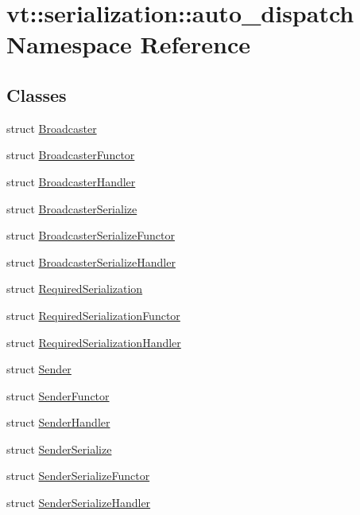 \hypertarget{namespacevt_1_1serialization_1_1auto__dispatch}{}\section{vt\+:\+:serialization\+:\+:auto\+\_\+dispatch Namespace Reference}
\label{namespacevt_1_1serialization_1_1auto__dispatch}
\subsection*{Classes}
\begin{DoxyCompactItemize}
\item 
struct \hyperlink{structvt_1_1serialization_1_1auto__dispatch_1_1_broadcaster}{Broadcaster}
\item 
struct \hyperlink{structvt_1_1serialization_1_1auto__dispatch_1_1_broadcaster_functor}{Broadcaster\+Functor}
\item 
struct \hyperlink{structvt_1_1serialization_1_1auto__dispatch_1_1_broadcaster_handler}{Broadcaster\+Handler}
\item 
struct \hyperlink{structvt_1_1serialization_1_1auto__dispatch_1_1_broadcaster_serialize}{Broadcaster\+Serialize}
\item 
struct \hyperlink{structvt_1_1serialization_1_1auto__dispatch_1_1_broadcaster_serialize_functor}{Broadcaster\+Serialize\+Functor}
\item 
struct \hyperlink{structvt_1_1serialization_1_1auto__dispatch_1_1_broadcaster_serialize_handler}{Broadcaster\+Serialize\+Handler}
\item 
struct \hyperlink{structvt_1_1serialization_1_1auto__dispatch_1_1_required_serialization}{Required\+Serialization}
\item 
struct \hyperlink{structvt_1_1serialization_1_1auto__dispatch_1_1_required_serialization_functor}{Required\+Serialization\+Functor}
\item 
struct \hyperlink{structvt_1_1serialization_1_1auto__dispatch_1_1_required_serialization_handler}{Required\+Serialization\+Handler}
\item 
struct \hyperlink{structvt_1_1serialization_1_1auto__dispatch_1_1_sender}{Sender}
\item 
struct \hyperlink{structvt_1_1serialization_1_1auto__dispatch_1_1_sender_functor}{Sender\+Functor}
\item 
struct \hyperlink{structvt_1_1serialization_1_1auto__dispatch_1_1_sender_handler}{Sender\+Handler}
\item 
struct \hyperlink{structvt_1_1serialization_1_1auto__dispatch_1_1_sender_serialize}{Sender\+Serialize}
\item 
struct \hyperlink{structvt_1_1serialization_1_1auto__dispatch_1_1_sender_serialize_functor}{Sender\+Serialize\+Functor}
\item 
struct \hyperlink{structvt_1_1serialization_1_1auto__dispatch_1_1_sender_serialize_handler}{Sender\+Serialize\+Handler}
\end{DoxyCompactItemize}
